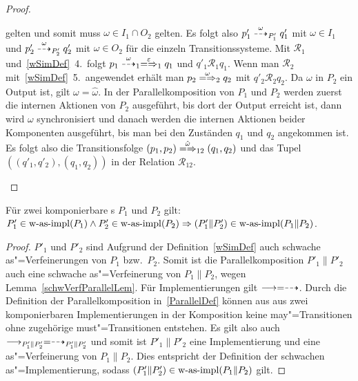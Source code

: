 \begin{proof}
\begin{enumerate}
\begin{itemize}
          gelten und somit muss \oBdA{} $\omega\in I_1\cap O_2$ gelten. Es
          folgt also $p'_1\may[\omega]_{P'_1} q'_1$ mit $\omega\in I_1$ und
          $p'_2\may[\omega]_{P'_2} q'_2$ mit $\omega\in O_2$ für die einzeln
          Transitionssysteme. Mit $\mathcal{R}_1$ und~\ref{wSimDef}~4.\ folgt
          $p_1\may[\omega]_1 \weakmay[\varepsilon]_1 q_1$ und $q'_1
          \mathcal{R}_1 q_1$. Wenn man $\mathcal{R}_2$ mit~\ref{wSimDef}~5.\
          angewendet erhält man $p_2 \weakmay[\omega]_2 q_2$ mit
          $q'_2\mathcal{R}_2 q_2$. Da $\omega$ in $P_2$ ein Output ist, gilt
          $\omega =\hat{\omega}$. In der Parallelkomposition von $P_1$ und
          $P_2$ werden zuerst die internen Aktionen von $P_2$ ausgeführt, bis
          dort der Output erreicht ist, dann wird $\omega$ synchronisiert und
          danach werden die internen Aktionen beider Komponenten ausgeführt,
          bis man bei den Zuständen $q_1$ und $q_2$ angekommen ist. Es folgt
          also die Transitionsfolge $(p_1,p_2) \weakmay[\hat{\omega}]_{12}
          (q_1,q_2)$ und das Tupel $((q'_1,q'_2),(q_1,q_2))$ in der Relation
          $\mathcal{R}_{12}$.
      \end{itemize}
  \end{enumerate}
\end{proof}

\begin{Kor}
  \label{schwImpParallelKor}
  Für zwei komponierbare \MEIO{}s $P_1$ und $P_2$ gilt:
  $P'_1\in\mathrm{w}\text{-}\mathrm{as}\text{-}\mathrm{impl} (P_1) \land P'_2 \in\mathrm{w}\text{-}\mathrm{as}\text{-}\mathrm{impl} (P_2) \Rightarrow (P'_1\|P'_2)
  \in\mathrm{w}\text{-}\mathrm{as}\text{-}\mathrm{impl} (P_1\|P_2)$.
\end{Kor}
\begin{proof}
  $P'_1$ und $P'_2$ sind Aufgrund der Definition~\ref{wSimDef} auch schwache
  as"=Verfeinerungen von $P_1$ bzw.\ $P_2$. Somit ist die Parallelkomposition
  $P'_1\|P'_2$ auch eine schwache as"=Verfeinerung von $P_1\|P_2$, wegen
  Lemma~\ref{schwVerfParallelLem}. Für Implementierungen gilt $\must =\may$.
  Durch die Definition der Parallelkomposition in~\ref{ParallelDef} können aus
  aus zwei komponierbaren Implementierungen in der Komposition keine
  may"=Transitionen ohne zugehörige must"=Transitionen entstehen. Es gilt also
  auch $\must _{P'_1\|P'_2} =\may _{P'_1\|P'_2}$ und somit ist $P'_1\|P'_2$
  eine Implementierung und eine as"=Verfeinerung von $P_1\|P_2$. Dies
  entspricht der Definition der schwachen as"=Implementierung, sodass
  $(P'_1\|P'_2)\in\mathrm{w}\text{-}\mathrm{as}\text{-}\mathrm{impl} (P_1\|P_2)$ gilt.
\end{proof}

